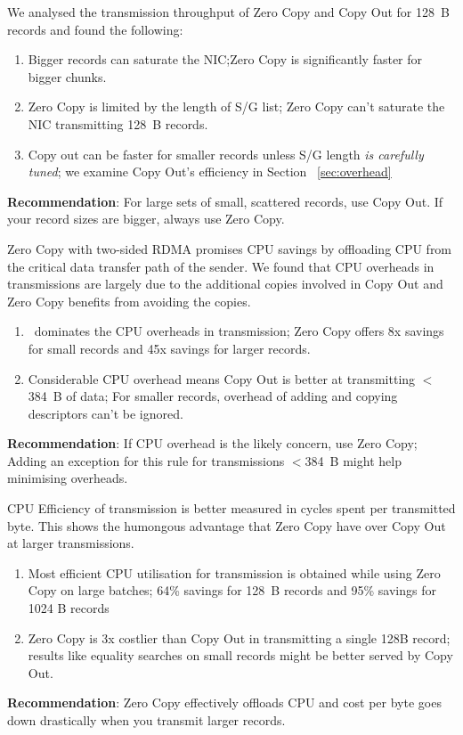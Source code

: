 We analysed the transmission throughput of Zero Copy and Copy Out for 128~B records and found the following:
  \begin{enumerate}
  \item Bigger records can saturate the NIC;Zero Copy is significantly faster for bigger chunks.
  \item Zero Copy is limited by the length of S/G list; Zero Copy can't saturate the NIC transmitting 128~B records.
  \item Copy out can be faster for smaller records unless S/G length {\em is carefully tuned}; we examine Copy Out's efficiency in Section ~\ref{sec:overhead}
  \end{enumerate}
  \textbf{Recommendation}: For large sets of small, scattered records, use Copy Out. If your record sizes are bigger, always use Zero Copy.

Zero Copy with two-sided RDMA promises CPU savings by offloading CPU from the critical data transfer path of the sender. We found that 
CPU overheads in transmissions are largely due to the additional copies involved in Copy Out and Zero Copy benefits from avoiding the copies.
  \begin{enumerate}
  \item \memcpy ~dominates the CPU overheads in transmission; Zero Copy offers 8x savings for small records and 45x savings for larger records.
  \item Considerable CPU overhead means Copy Out is better at transmitting $<$384~B of data; For smaller records, overhead of adding and copying descriptors can't be ignored.
  \end{enumerate}
  \textbf{Recommendation}: If CPU overhead is the likely concern, use Zero Copy; Adding an exception for this rule for transmissions $<$384~B might help minimising overheads.

CPU Efficiency of transmission is better measured in cycles spent per transmitted byte. This shows the humongous advantage that Zero Copy have over Copy Out 
at larger transmissions.
  \begin{enumerate}
  \item Most efficient CPU utilisation for transmission is obtained while using Zero Copy on large batches; 64\% savings for 128~B records and 95\% savings for 1024 B records
  \item Zero Copy is 3x costlier than Copy Out in transmitting a single 128B record; results like equality searches on small records might be better served by Copy Out. 
  \end{enumerate}
  \textbf{Recommendation}: Zero Copy effectively offloads CPU and cost per byte goes down drastically when you transmit larger records.


